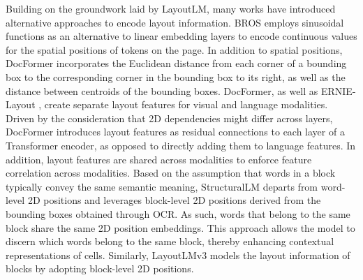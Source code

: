 Building on the groundwork laid by LayoutLM, many works have introduced alternative approaches to encode layout information. BROS \citep{hong2020bros} employs sinusoidal functions as an alternative to linear embedding layers to encode continuous values for the spatial positions of tokens on the page. In addition to spatial positions, DocFormer \citep{appalaraju2021docformer} incorporates the Euclidean distance from each corner of a bounding box to the corresponding corner in the bounding box to its right, as well as the distance between centroids of the bounding boxes. DocFormer, as well as ERNIE-Layout \citep{peng2022ernie}, create separate layout features for visual and language modalities. Driven by the consideration that 2D dependencies might differ across layers, DocFormer introduces layout features as residual connections to each layer of a Transformer encoder, as opposed to directly adding them to language features. In addition, layout features are shared across modalities to enforce feature correlation across modalities. Based on the assumption that words in a block typically convey the same semantic meaning, StructuralLM \citep{li2021structurallm} departs from word-level 2D positions and leverages block-level 2D positions derived from the bounding boxes obtained through \ac{OCR}. As such, words that belong to the same block share the same 2D position embeddings. This approach allows the model to discern which words belong to the same block, thereby enhancing contextual representations of cells. Similarly, LayoutLMv3 \citep{huang2022layoutlmv3} models the layout information of blocks by adopting block-level 2D positions.


